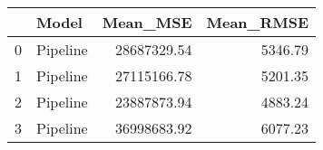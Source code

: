 \begin{tabular}{llrr}
\toprule
{} &     Model &    Mean\_MSE &  Mean\_RMSE \\
\midrule
0 &  Pipeline & 28687329.54 &    5346.79 \\
1 &  Pipeline & 27115166.78 &    5201.35 \\
2 &  Pipeline & 23887873.94 &    4883.24 \\
3 &  Pipeline & 36998683.92 &    6077.23 \\
\bottomrule
\end{tabular}

